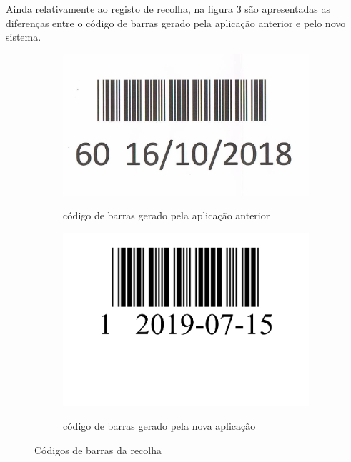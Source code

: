 \newpage
Ainda relativamente ao registo de recolha, na figura \ref{fig:comparacao_recolhacb} são apresentadas as diferenças entre o código de barras gerado pela aplicação anterior e pelo novo sistema.
\begin{figure}[H]
	\centering
	
	\begin{subfigure}[t]{0.45\linewidth}
		\includegraphics[width=\linewidth]{figuras/AppAccess/2-CodBarras.jpg}
		\label{fig:comparacao_recolhacb_1}
		\caption{código de barras gerado pela aplicação anterior}
	\end{subfigure}
	\begin{subfigure}[t]{0.45\linewidth}
		\includegraphics[width=\linewidth]{figuras/AppPhp/2-CodBarras.png}
		\label{fig:comparacao_recolhacb_2}
		\caption{código de barras gerado pela nova aplicação}
	\end{subfigure}
	
	\caption{Códigos de barras da recolha}
	\label{fig:comparacao_recolhacb}
\end{figure}

